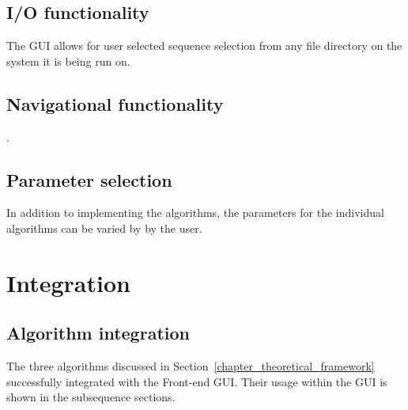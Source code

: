 \subsection{I/O functionality}
The GUI allows for user selected sequence selection from any file directory on
the system it is being run on.

\subsection{Navigational functionality}.


\subsection{Parameter selection}
In addition to implementing the algorithms, the parameters for the individual
algorithms can be varied by by the user.

\section{Integration}

\subsection{Algorithm integration}
The three algorithms discussed in Section~\ref{chapter_theoretical_framework}
successfully integrated with the Front-end GUI. Their usage within the GUI is
shown in the subsequence sections.

